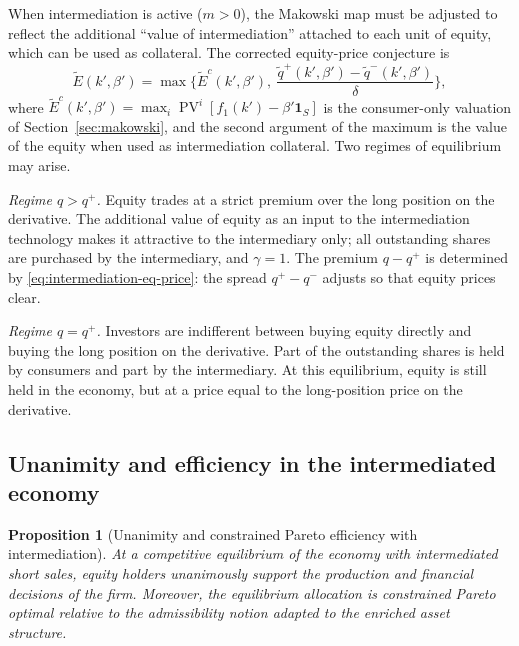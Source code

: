 \documentclass[11pt,a4paper,oneside]{book}
\def\1{\mathbf{1}}
\DeclareMathOperator{\PV}{PV}
\theoremstyle{plain}
\newtheorem{proposition}[theorem]{Proposition}
\theoremstyle{definition}
\theoremstyle{remark}
\numberwithin{equation}{chapter}
\begin{document}
When intermediation is active ($m > 0$), the Makowski map must be adjusted to reflect the additional ``value of intermediation'' attached to each unit of equity, which can be used as collateral.
The corrected equity-price conjecture is
\begin{equation}\label{eq:makowski-intermediation}
  \widetilde{E}(k', \beta')
  =
  \max \Biggl\{
  \widetilde{E}^c(k', \beta'),
  \ \frac{\widetilde{q}^+(k', \beta') - \widetilde{q}^-(k', \beta')}{\delta}
  \Biggr\},
\end{equation}
where $\widetilde{E}^c(k', \beta') = \max_i \PV^i[f_1(k') - \beta' \1_S]$ is the consumer-only valuation of Section~\ref{sec:makowski}, and the second argument of the maximum is the value of the equity when used as intermediation collateral.
Two regimes of equilibrium may arise.

\emph{Regime $q > q^+$.}
Equity trades at a strict premium over the long position on the derivative.
The additional value of equity as an input to the intermediation technology makes it attractive to the intermediary only; all outstanding shares are purchased by the intermediary, and $\gamma = 1$.
The premium $q - q^+$ is determined by \eqref{eq:intermediation-eq-price}: the spread $q^+ - q^-$ adjusts so that equity prices clear.

\emph{Regime $q = q^+$.}
Investors are indifferent between buying equity directly and buying the long position on the derivative.
Part of the outstanding shares is held by consumers and part by the intermediary.
At this equilibrium, equity is still held in the economy, but at a price equal to the long-position price on the derivative.

\subsection{Unanimity and efficiency in the intermediated economy}

\begin{proposition}[Unanimity and constrained Pareto efficiency with intermediation]\label{prop:intermediated-unanimity}
At a competitive equilibrium of the economy with intermediated short sales, \emph{equity holders} unanimously support the production and financial decisions of the firm.
Moreover, the equilibrium allocation is constrained Pareto optimal relative to the admissibility notion adapted to the enriched asset structure.
\end{proposition}
\end{document}
